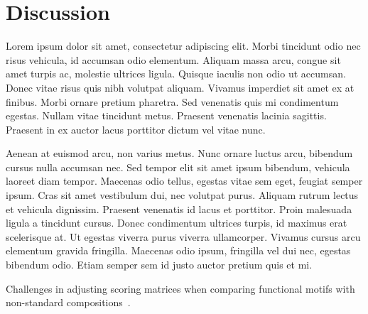 \documentclass[twocolumn]{miniclass}
\begin{document}
\section{Discussion}
Lorem ipsum dolor sit amet, consectetur adipiscing elit. Morbi tincidunt odio nec risus vehicula, id accumsan odio elementum. Aliquam massa arcu, congue sit amet turpis ac, molestie ultrices ligula. Quisque iaculis non odio ut accumsan. Donec vitae risus quis nibh volutpat aliquam. Vivamus imperdiet sit amet ex at finibus. Morbi ornare pretium pharetra. Sed venenatis quis mi condimentum egestas. Nullam vitae tincidunt metus. Praesent venenatis lacinia sagittis. Praesent in ex auctor lacus porttitor dictum vel vitae nunc.

Aenean at euismod arcu, non varius metus. Nunc ornare luctus arcu, bibendum cursus nulla accumsan nec. Sed tempor elit sit amet ipsum bibendum, vehicula laoreet diam tempor. Maecenas odio tellus, egestas vitae sem eget, feugiat semper ipsum. Cras sit amet vestibulum dui, nec volutpat purus. Aliquam rutrum lectus et vehicula dignissim. Praesent venenatis id lacus et porttitor. Proin malesuada ligula a tincidunt cursus. Donec condimentum ultrices turpis, id maximus erat scelerisque at. Ut egestas viverra purus viverra ullamcorper. Vivamus cursus arcu elementum gravida fringilla. Maecenas odio ipsum, fringilla vel dui nec, egestas bibendum odio. Etiam semper sem id justo auctor pretium quis et mi.

Challenges in adjusting scoring matrices when comparing functional motifs with non-standard compositions~\cite{jarnot2024challenges}.



\end{document}
